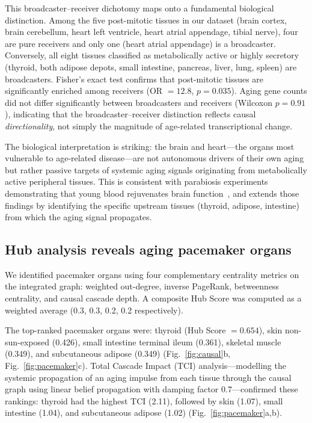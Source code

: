 \documentclass[11pt,a4paper]{article}
\begin{document}
This broadcaster--receiver dichotomy maps onto a fundamental biological distinction. Among the five post-mitotic tissues in our dataset (brain cortex, brain cerebellum, heart left ventricle, heart atrial appendage, tibial nerve), four are pure receivers and only one (heart atrial appendage) is a broadcaster. Conversely, all eight tissues classified as metabolically active or highly secretory (thyroid, both adipose depots, small intestine, pancreas, liver, lung, spleen) are broadcasters. Fisher's exact test confirms that post-mitotic tissues are significantly enriched among receivers (OR $= 12.8$, $p = 0.035$). Aging gene counts did not differ significantly between broadcasters and receivers (Wilcoxon $p = 0.91$), indicating that the broadcaster--receiver distinction reflects causal \textit{directionality}, not simply the magnitude of age-related transcriptional change.

The biological interpretation is striking: the brain and heart---the organs most vulnerable to age-related disease---are not autonomous drivers of their own aging but rather passive targets of systemic aging signals originating from metabolically active peripheral tissues. This is consistent with parabiosis experiments demonstrating that young blood rejuvenates brain function~\cite{ref7,ref8}, and extends those findings by identifying the specific upstream tissues (thyroid, adipose, intestine) from which the aging signal propagates.

\subsection*{Hub analysis reveals aging pacemaker organs}

We identified pacemaker organs using four complementary centrality metrics on the integrated graph: weighted out-degree, inverse PageRank, betweenness centrality, and causal cascade depth. A composite Hub Score was computed as a weighted average (0.3, 0.3, 0.2, 0.2 respectively).

The top-ranked pacemaker organs were: thyroid (Hub Score $= 0.654$), skin non-sun-exposed (0.426), small intestine terminal ileum (0.361), skeletal muscle (0.349), and subcutaneous adipose (0.349) (Fig.~\ref{fig:causal}b, Fig.~\ref{fig:pacemaker}c). Total Cascade Impact (TCI) analysis---modelling the systemic propagation of an aging impulse from each tissue through the causal graph using linear belief propagation with damping factor 0.7---confirmed these rankings: thyroid had the highest TCI (2.11), followed by skin (1.07), small intestine (1.04), and subcutaneous adipose (1.02) (Fig.~\ref{fig:pacemaker}a,b).
\end{document}
